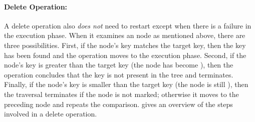 \paragraph{Delete Operation:} 

A delete operation also \emph{does not} need to restart except when there is a failure in the execution phase. When it examines an \myanchor{} node as mentioned above, there are three possibilities. First, if the \myanchor{} node's key matches the target key, then the key has been found and the operation moves to the execution phase. Second, if the \myanchor{} node's key is greater than the target key (the \myanchor{} node has become \myinconsistent{}), then the operation concludes that the key is not present in the tree and terminates. Finally, if the \myanchor{} node's key is smaller than the target key (the \myanchor{} node is still \myconsistent{}), then the traversal terminates if the node is not marked; otherwise it moves to the preceding \myanchor{} node and repeats the comparison.  gives an overview of the steps involved in a delete operation.